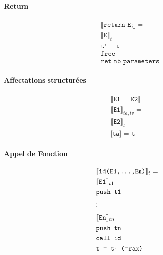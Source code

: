 \documentclass[12pt,twocolumn]{report}
\begin{document}
\begin{trad}
    \paragraph*{Return}
    \begin{align*}
        &\llbracket \texttt{return E;} \rrbracket= \\
        &\llbracket \texttt{E} \rrbracket_{t} \\
        &\texttt{t' = t} \\
        &\texttt{free}\\
        &\texttt{ret nb\_parameters} 
    \end{align*}
\end{trad}
\begin{trad}
    \paragraph*{Affectations structurées}
    \begin{align*}
        &\llbracket \texttt{E1 = E2} \rrbracket= \\
        &\llbracket \texttt{E1} \rrbracket_{ta,tv}= \\
        &\llbracket \texttt{E2} \rrbracket_{t}\\
        &\texttt{[ta] = t} 
    \end{align*}
\end{trad}
\begin{trad}
    \paragraph*{Appel de Fonction}
    \begin{align*}
        &\llbracket \texttt{id(E1,\dots,En)} \rrbracket_t= \\
        &\llbracket \texttt{E1} \rrbracket_{t1} \\
        &\texttt{push t1} \\
        &\vdots\\
        &\llbracket \texttt{En} \rrbracket_{tn}\\
        &\texttt{push tn} \\
        &\texttt{call id}\\
        &\texttt{t = t' (=rax)}
    \end{align*}
\end{trad}
\end{document}
